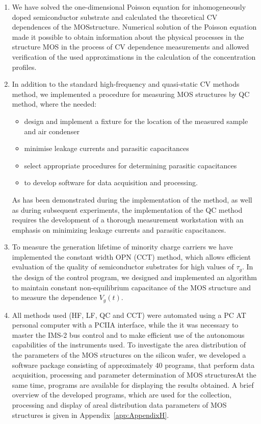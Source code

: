 \begin{enumerate}

\item We have solved the one-dimensional Poisson equation for
  inhomogeneously doped semiconductor substrate and calculated the
  theoretical CV dependences of the MOS\@ structure. Numerical
  solution of the Poisson equation made it possible to obtain
  information about the physical processes in the structure MOS in the
  process of CV dependence measurements and allowed verification of
  the used approximations in the calculation of the concentration
  profiles.

\item In addition to the standard high-frequency and quasi-static CV
  methods method, we implemented a procedure for measuring MOS
  structures by QC method, where the needed:

  \begin{itemize}
  \item design and implement a fixture for the location of the measured sample and
    air condenser
  \item minimise leakage currents and parasitic capacitances
  \item select appropriate procedures for determining parasitic capacitances
  \item to develop software for data acquisition and processing.
  \end{itemize}

  As has been demonstrated during the implementation of the method, as
  well as during subsequent experiments, the implementation of the QC
  method requires the development of a thorough measurement
  workstation with an emphasis on minimizing leakage currents and
  parasitic capacitances.

\item To measure the generation lifetime of minority charge carriers
  we have implemented the constant width OPN (CCT) method, which
  allows efficient evaluation of the quality of semiconductor
  substrates for high values of $\tau_{g}$. In the design of the
  control program, we designed and implemented an algorithm to
  maintain constant non-equilibrium capacitance of the MOS structure
  and to measure the dependence $V_{g}(t)$.

\item All methods used (HF, LF, QC and CCT) were automated using a PC
  AT personal computer with a PCIIA interface, while the it was
  necessary to master the IMS-2 bus control and to make efficient use
  of the autonomous capabilities of the instruments used. To
  investigate the area distribution of the parameters of the MOS
  structures on the silicon wafer, we developed a software package
  consisting of approximately 40 programs, that perform data
  acquisition, processing and parameter determination of MOS
  structures\@ At the same time, programs are available for displaying
  the results obtained. A brief overview of the developed programs,
  which are used for the collection, processing and display of areal
  distribution data parameters of MOS structures is given in
  Appendix~\ref{app:AppendixH}.


\end{enumerate}
